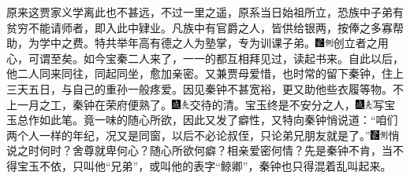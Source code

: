 原来这贾家义学离此也不甚远，不过一里之遥，原系当日始祖所立，恐族中子弟有贫穷不能请师者，即入此中肄业。凡族中有官爵之人，皆供给银两，按俸之多寡帮助，为学中之费。特共举年高有德之人为塾掌，专为训课子弟。{\includegraphics[width=3mm]{../Images/00006}\includegraphics[width=3mm]{../Images/00011}\footnotesize \kaishu 创立者之用心，可谓至矣。}如今宝秦二人来了，一一的都互相拜见过，读起书来。自此以后，他二人同来同往，同起同坐，愈加亲密。又兼贾母爱惜，也时常的留下秦钟，住上三天五日，与自己的重孙一般疼爱。因见秦钟不甚宽裕，更又助他些衣履等物。不上一月之工，秦钟在荣府便熟了。{\includegraphics[width=3mm]{../Images/00005}\includegraphics[width=3mm]{../Images/00012}\footnotesize \kaishu 交待的清。}宝玉终是不安分之人，{\includegraphics[width=3mm]{../Images/00005}\includegraphics[width=3mm]{../Images/00012}\footnotesize \kaishu 写宝玉总作如此笔。}竟一味的随心所欲，因此又发了癖性，又特向秦钟悄说道：``咱们两个人一样的年纪，况又是同窗，以后不必论叔侄，只论弟兄朋友就是了。''{\includegraphics[width=3mm]{../Images/00006}\includegraphics[width=3mm]{../Images/00011}\footnotesize \kaishu 悄说之时何时？舍尊就卑何心？随心所欲何癖？相亲爱密何情？}先是秦钟不肯，当不得宝玉不依，只叫他``兄弟''，或叫他的表字``鲸卿''，秦钟也只得混着乱叫起来。


